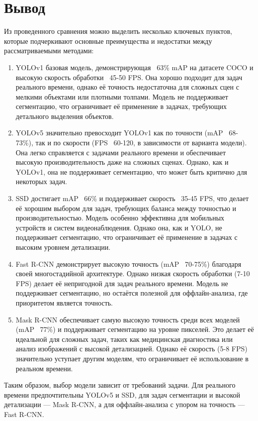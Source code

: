 \section*{Вывод}

Из проведенного сравнения можно выделить несколько ключевых пунктов, которые подчеркивают основные преимущества и недостатки между рассматриваемыми методами:
\begin{enumerate}[leftmargin=1.6\parindent]
	\item YOLOv1 базовая модель, демонстрирующая ~63\% mAP на датасете COCO и высокую скорость обработки ~45-50 FPS. Она хорошо подходит для задач реального времени, однако её точность недостаточна для сложных сцен с мелкими объектами или плотными толпами. Модель не поддерживает сегментацию, что ограничивает её применение в задачах, требующих детального выделения объектов.
	\item YOLOv5 значительно превосходит YOLOv1 как по точности (mAP ~68-73\%), так и по скорости (FPS ~60-120, в зависимости от варианта модели). Она легко справляется с задачами реального времени и обеспечивает высокую производительность даже на сложных сценах. Однако, как и YOLOv1, она не поддерживает сегментацию, что может быть критично для некоторых задач.
        \item SSD достигает mAP ~66\% и поддерживает скорость ~35-45 FPS, что делает её хорошим выбором для задач, требующих баланса между точностью и производительностью. Модель особенно эффективна для мобильных устройств и систем видеонаблюдения. Однако она, как и YOLO, не поддерживает сегментацию, что ограничивает её применение в задачах с высоким уровнем детализации.
        \item Fast R-CNN демонстрирует высокую точность (mAP ~70-75\%) благодаря своей многостадийной архитектуре. Однако низкая скорость обработки (7-10 FPS) делает её непригодной для задач реального времени. Модель не поддерживает сегментацию, но остаётся полезной для оффлайн-анализа, где приоритетом является точность.
        \item Mask R-CNN обеспечивает самую высокую точность среди всех моделей (mAP ~77\%) и поддерживает сегментацию на уровне пикселей. Это делает её идеальной для сложных задач, таких как медицинская диагностика или анализ изображений с высокой детализацией. Однако её скорость (5-8 FPS) значительно уступает другим моделям, что ограничивает её использование в реальном времени.
\end{enumerate}

Таким образом, выбор модели зависит от требований задачи. Для реального времени предпочтительны YOLOv5 и SSD, для задач сегментации и высокой детализации — Mask R-CNN, а для оффлайн-анализа с упором на точность — Fast R-CNN.
